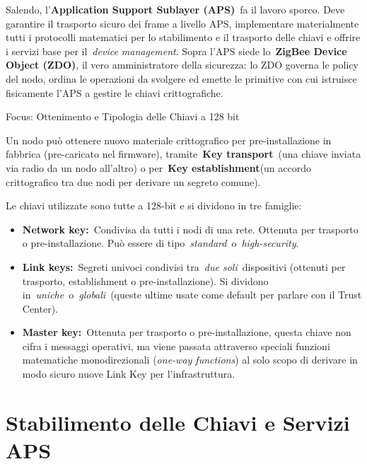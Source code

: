 \documentclass[
  italian,
  openany]{book}
\begin{document}
Salendo, l'\textbf{Application Support Sublayer (APS)}~fa il lavoro
sporco. Deve garantire il trasporto sicuro dei frame a livello APS,
implementare materialmente tutti i protocolli matematici per lo
stabilimento e il trasporto delle chiavi e offrire i servizi base per
il~\emph{device management}. Sopra l'APS siede lo~\textbf{ZigBee Device
Object (ZDO)}, il vero amministratore della sicurezza: lo ZDO governa le
policy del nodo, ordina le operazioni da svolgere ed emette le primitive
con cui istruisce fisicamente l'APS a gestire le chiavi crittografiche.

\begin{calloutimportant}{Focus: Ottenimento e Tipologia delle Chiavi a 128 bit}

Un nodo può ottenere nuovo materiale crittografico per pre-installazione
in fabbrica (pre-caricato nel firmware), tramite~\textbf{Key
transport}~(una chiave inviata via radio da un nodo all'altro) o
per~\textbf{Key establishment}(un accordo crittografico tra due nodi per
derivare un segreto comune).

Le chiavi utilizzate sono tutte a 128-bit e si dividono in tre famiglie:

\begin{itemize}
\item
  \textbf{Network key:}~Condivisa da tutti i nodi di una rete. Ottenuta
  per trasporto o pre-installazione. Può essere di
  tipo~\emph{standard}~o~\emph{high-security}.
\item
  \textbf{Link keys:}~Segreti univoci condivisi tra~\emph{due
  soli}~dispositivi (ottenuti per trasporto, establishment o
  pre-installazione). Si dividono
  in~\emph{uniche}~o~\emph{globali}~(queste ultime usate come default
  per parlare con il Trust Center).
\item
  \textbf{Master key:}~Ottenuta per trasporto o pre-installazione,
  questa chiave non cifra i messaggi operativi, ma viene passata
  attraverso speciali funzioni matematiche monodirezionali
  (\emph{one-way functions}) al solo scopo di derivare in modo sicuro
  nuove Link Key per l'infrastruttura.
\end{itemize}

\end{calloutimportant}

\section{Stabilimento delle Chiavi e Servizi
APS}\label{stabilimento-delle-chiavi-e-servizi-aps}
\end{document}
